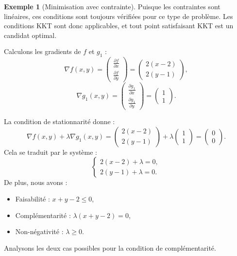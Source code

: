\documentclass[a4paper,12pt,openany]{book}
\theoremstyle{plain}
\theoremstyle{definition}
\newtheorem{example}[theorem]{Exemple}
\theoremstyle{remark}
\theoremstyle{nbstyle}
\begin{document}
\begin{example}[Minimisation avec contrainte]
	Puisque les contraintes sont linéaires, ces conditions sont toujours vérifiées pour ce type de problème. Les conditions KKT sont donc applicables, et tout point satisfaisant KKT est un candidat optimal.
	
	Calculons les gradients de \(f\) et \(g_1\) :
	\[
	\nabla f(x, y) = \begin{pmatrix} \frac{\partial f}{\partial x} \\ \frac{\partial f}{\partial y} \end{pmatrix} = \begin{pmatrix} 2(x - 2) \\ 2(y - 1) \end{pmatrix},
	\]
	\[
	\nabla g_1(x, y) = \begin{pmatrix} \frac{\partial g_1}{\partial x} \\ \frac{\partial g_1}{\partial y} \end{pmatrix} = \begin{pmatrix} 1 \\ 1 \end{pmatrix}.
	\]
	
	La condition de stationnarité donne :
	\[
	\nabla f(x, y) + \lambda \nabla g_1(x, y) = \begin{pmatrix} 2(x - 2) \\ 2(y - 1) \end{pmatrix} + \lambda \begin{pmatrix} 1 \\ 1 \end{pmatrix} = \begin{pmatrix} 0 \\ 0 \end{pmatrix}.
	\]
	Cela se traduit par le système :
	\[
	\begin{cases}
	2(x - 2) + \lambda = 0, \\
	2(y - 1) + \lambda = 0.
	\end{cases}
	\]
	De plus, nous avons :
	\begin{itemize}
		\item Faisabilité : \(x + y - 2 \leq 0\),
		\item Complémentarité : \(\lambda (x + y - 2) = 0\),
		\item Non-négativité : \(\lambda \geq 0\).
	\end{itemize}
	
	Analysons les deux cas possibles pour la condition de complémentarité.
	

\end{example}
\end{document}
